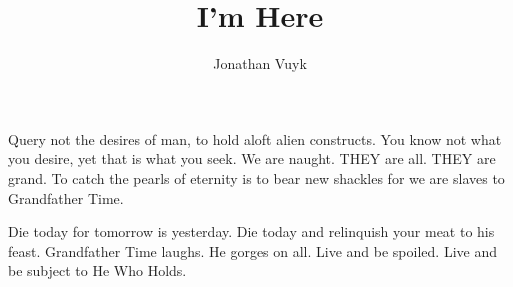 \documentclass[9pt]{memoir}
\title{I'm Here}
\author{Jonathan Vuyk}
\date{}
\begin{document}

\clearpage
\maketitle
\thispagestyle{empty}





\frontmatter


\begin{displayquote}

    Query not the desires of man, to hold aloft alien constructs. You know not what you desire, yet that is what you seek. We are naught. THEY are all. THEY are grand. To catch the pearls of eternity is to bear new shackles for we are slaves to Grandfather Time.

    Die today for tomorrow is yesterday. Die today and relinquish your meat to his feast. Grandfather Time laughs. He gorges on all. Live and be spoiled. Live and be subject to He Who Holds.

\end{displayquote}
\end{document}
